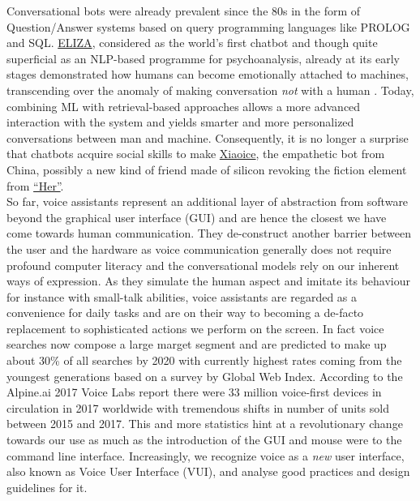 Conversational bots were already prevalent since the 80s in the form of Question/Answer systems based on query programming languages like PROLOG and SQL.
\href{https://en.wikipedia.org/wiki/ELIZA}{ELIZA}, considered as the world's first chatbot and though quite superficial as an NLP-based programme for psychoanalysis, already at its early stages demonstrated how humans can become emotionally attached to machines, transcending over the anomaly of making conversation \textit{not} with a human \cite{Weizenbaum1976}.
Today, combining ML with retrieval-based approaches allows a more advanced interaction with the system and yields smarter and more personalized conversations between man and machine.
Consequently, it is no longer a surprise that chatbots acquire social skills to make \href{https://en.wikipedia.org/wiki/Xiaoice}{Xiaoice}, the empathetic bot from China, possibly a new kind of friend made of silicon revoking the fiction element from \hyperlink{hermovie}{``Her''}.\\ 

So far, voice assistants represent an additional layer of abstraction from software beyond the graphical user interface (GUI) and are hence the closest we have come towards human communication.
They de-construct another barrier between the user and the hardware as voice communication generally does not require profound computer literacy and the conversational models rely on our inherent ways of expression.
As they simulate the human aspect and imitate its behaviour for instance with small-talk abilities\cite{hiddenbrainpod}, voice assistants are regarded as a convenience for daily tasks and are on their way to becoming a de-facto replacement to sophisticated actions we perform on the screen.
In fact voice searches now compose a large marget segment 
and are predicted to make up about 30\% \cite{gartnerpreds17}\cite{searchblog}
of all searches by 2020 with currently highest rates coming from the youngest generations based on a survey\cite{globalwebindex} by Global Web Index. 
According to the Alpine.ai 2017 Voice Labs report there were 33 million voice-first devices in circulation in 2017 worldwide \cite{voicelabs} with tremendous shifts in number of units sold between 2015 and 2017.
This and more statistics hint at a revolutionary change towards our use as much as the introduction of the GUI and mouse were to the command line interface.
Increasingly, we recognize voice as a \textit{new} user interface, also known as Voice User Interface (VUI), and analyse good practices and design guidelines for it.\\

